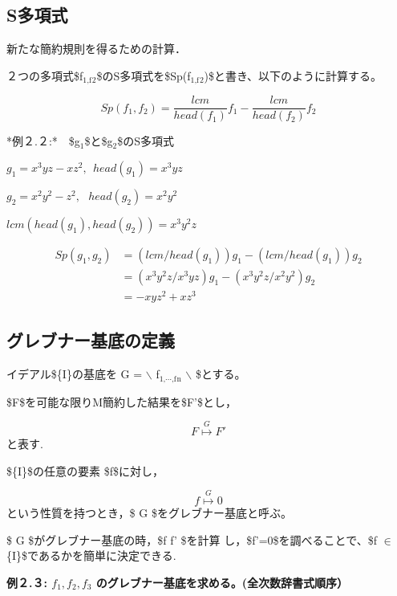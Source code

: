 \documentclass[a4j,12pt]{jarticle}
\begin{document}
\subsection{S多項式}
\label{sec:orgec5c7e5}

新たな簡約規則を得るための計算．

２つの多項式\$f\(_{\text{1,f}}\)\(_{\text{2}}\)\$のS多項式を\$Sp(f\(_{\text{1,f}}\)\(_{\text{2}}\))\$と書き、以下のように計算する。

$$Sp(f_1,f_2)= \frac{lcm}{head(f_1)}f_1 - \frac{lcm}{head(f_2)}f_2$$

*例２.２:*　\$g\(_{\text{1}}\)\$と\$g\(_{\text{2}}\)\$のS多項式

\(g_1 = x^3yz - xz^2,\ \   head(g_1) = x^3yz\)

\(g_2 = x^2y^2 - z^2,\ \  \  head(g_2) = x^2y^2\)

\(lcm(head(g_1), head(g_2)) = x^3y^2z\)

$$\begin{array}{ll} 
Sp(g_1,g_2) &= ( lcm / head(g_1) ) g_1 - ( lcm / head(g_1)) g_2 \\
            &= ( x^3y^2z / x^3yz ) g_1 - ( x^3y^2z / x^2y^2 ) g_2 \\
            &= -xyz^2 + xz^3
\end{array}$$

\subsection{グレブナー基底の定義}
\label{sec:org2a2b7f2}

イデアル\$\{\cal I\}\(の基底を\) G = $\backslash${ f\(_{\text{1,}\cdots{}\text{,f}}\)\(_{\text{n}}\) $\backslash$} \$とする。

\$F\$を可能な限りM簡約した結果を\$F'\$とし，

$$F \stackrel{G}{\longmapsto} F'$$ と表す.

\$\{\cal I\}\$の任意の要素 \$f\$に対し，

$$f \stackrel{G}{\longmapsto} 0$$
という性質を持つとき，\$ G \$をグレブナー基底と呼ぶ。

\$ G \$がグレブナー基底の時，\$f \stackrel{\psi}{\longmapsto} f' \$を計算
し，\$f'=0\$を調べることで、\$f \(\in\) \{\cal I\}\$であるかを簡単に決定できる.

\textbf{例２.３: \(f_1,f_2,f_3\) のグレブナー基底を求める。(全次数辞書式順序）}
\end{document}
